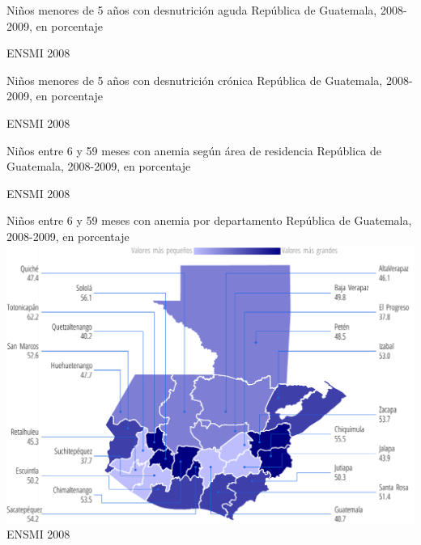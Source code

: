 
%
{%
}%
{%
	Niños menores de 5 años con desnutrición aguda} %
{%
	República de Guatemala, 2008-2009, en porcentaje} %
{%
	\begin{tikzpicture}[x=1pt,y=1pt]    \end{tikzpicture}}%
{%
	ENSMI 2008} %



%
{%
}%
{%
	Niños menores de 5 años con desnutrición crónica} %
{%
	República de Guatemala, 2008-2009, en porcentaje} %
{%
	\begin{tikzpicture}[x=1pt,y=1pt]    \end{tikzpicture}}%
{%
	ENSMI 2008} %



%
{%
}%
{%
	Niños entre 6 y 59 meses con anemia según área de residencia} %
{%
	República de Guatemala, 2008-2009, en porcentaje} %
{%
	\begin{tikzpicture}[x=1pt,y=1pt]    \end{tikzpicture}}%
{%
	ENSMI 2008} %


%
{%
}%
{%
	Niños entre 6 y 59 meses con anemia por departamento} %
{%
	República de Guatemala, 2008-2009, en porcentaje} %
{%
	\includegraphics[width=52\cuadri]{graficas/6_09.pdf}}%
{%
	ENSMI 2008} %